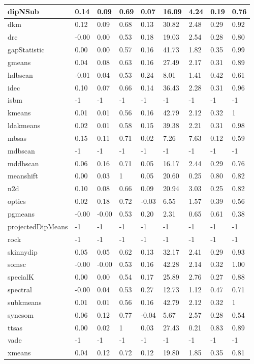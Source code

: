 \begin{table}[H]
\begin{tabular}{|l|l|l|l|l|l|l|l|l|}
\hline
dipNSub & 0.14 & 0.09 & 0.69 & 0.07 & 16.09 & 4.24 & 0.19 & 0.76 \\
\hline
dkm & 0.12 & 0.09 & 0.68 & 0.13 & 30.82 & 2.48 & 0.29 & 0.92 \\
\hline
drc & -0.00 & 0.00 & 0.53 & 0.18 & 19.03 & 2.54 & 0.28 & 0.80 \\
\hline
gapStatistic & 0.00 & 0.00 & 0.57 & 0.16 & 41.73 & 1.82 & 0.35 & 0.99 \\
\hline
gmeans & 0.04 & 0.08 & 0.63 & 0.16 & 27.49 & 2.17 & 0.31 & 0.89 \\
\hline
hdbscan & -0.01 & 0.04 & 0.53 & 0.24 & 8.01 & 1.41 & 0.42 & 0.61 \\
\hline
idec & 0.10 & 0.07 & 0.66 & 0.14 & 36.43 & 2.28 & 0.31 & 0.96 \\
\hline
isbm & -1 & -1 & -1 & -1 & -1 & -1 & -1 & -1 \\
\hline
kmeans & 0.01 & 0.01 & 0.56 & 0.16 & 42.79 & 2.12 & 0.32 & 1 \\
\hline
ldakmeans & 0.02 & 0.01 & 0.58 & 0.15 & 39.38 & 2.21 & 0.31 & 0.98 \\
\hline
mbsas & 0.15 & 0.11 & 0.71 & 0.02 & 7.26 & 7.63 & 0.12 & 0.59 \\
\hline
mdbscan & -1 & -1 & -1 & -1 & -1 & -1 & -1 & -1 \\
\hline
mddbscan & 0.06 & 0.16 & 0.71 & 0.05 & 16.17 & 2.44 & 0.29 & 0.76 \\
\hline
meanshift & 0.00 & 0.03 & 1 & 0.05 & 20.60 & 0.25 & 0.80 & 0.82 \\
\hline
n2d & 0.10 & 0.08 & 0.66 & 0.09 & 20.94 & 3.03 & 0.25 & 0.82 \\
\hline
optics & 0.02 & 0.18 & 0.72 & -0.03 & 6.55 & 1.57 & 0.39 & 0.56 \\
\hline
pgmeans & -0.00 & -0.00 & 0.53 & 0.20 & 2.31 & 0.65 & 0.61 & 0.38 \\
\hline
projectedDipMeans & -1 & -1 & -1 & -1 & -1 & -1 & -1 & -1 \\
\hline
rock & -1 & -1 & -1 & -1 & -1 & -1 & -1 & -1 \\
\hline
skinnydip & 0.05 & 0.05 & 0.62 & 0.13 & 32.17 & 2.41 & 0.29 & 0.93 \\
\hline
somsc & -0.00 & -0.00 & 0.53 & 0.16 & 42.28 & 2.14 & 0.32 & 1.00 \\
\hline
specialK & 0.00 & 0.00 & 0.54 & 0.17 & 25.89 & 2.76 & 0.27 & 0.88 \\
\hline
spectral & -0.00 & 0.04 & 0.53 & 0.27 & 12.73 & 1.12 & 0.47 & 0.71 \\
\hline
subkmeans & 0.01 & 0.01 & 0.56 & 0.16 & 42.79 & 2.12 & 0.32 & 1 \\
\hline
syncsom & 0.06 & 0.12 & 0.77 & -0.04 & 5.67 & 2.57 & 0.28 & 0.54 \\
\hline
ttsas & 0.00 & 0.02 & 1 & 0.03 & 27.43 & 0.21 & 0.83 & 0.89 \\
\hline
vade & -1 & -1 & -1 & -1 & -1 & -1 & -1 & -1 \\
\hline
xmeans & 0.04 & 0.12 & 0.72 & 0.12 & 19.80 & 1.85 & 0.35 & 0.81 \\
\hline
\end{tabular}
\end{table}
